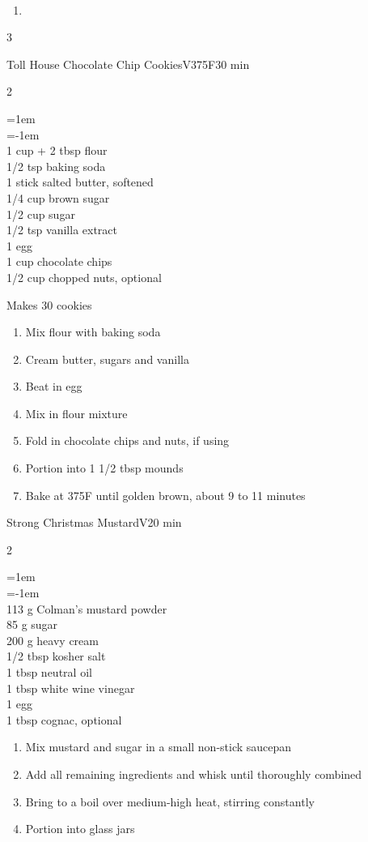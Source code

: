 \documentclass{article}
\makeatletter
\newcommand*{\whiten}[1]{\llap{\textcolor{white}{{\the\SOUL@token}}\hspace{#1pt}}}
\DeclareRobustCommand*\ful{%
    \def\SOUL@everyspace{\underline{\space}\kern\z@}%
    \def\SOUL@everytoken{%
     \setbox0=\hbox{\the\SOUL@token}%
     \ifdim\dp0>\z@
        \raisebox{\dp0}{\underline{\phantom{\the\SOUL@token}}}%
        \whiten{1}\whiten{0}%
        \whiten{-1}\whiten{-2}%
        \llap{\the\SOUL@token}%
     \else
        \underline{\the\SOUL@token}%
     \fi}%
\SOUL@}
\newenvironment{card}[3][]
    {\begin{cardbase}[#1]{#2}{#3}\\}
    {\end{cardbase}}
\newenvironment{densecard}[3][]
    {\small
    \begin{card}[#1]{#2}{#3}}
    {\end{card}}
\newenvironment{recipe}[3][]
    {\begin{cardbase}[#1]{#2}{#3}
    \columnratio{0.333}
    \begin{paracol}{2}}
    {\end{paracol}\end{cardbase}}
\newcommand{\nextcolumn}{\switchcolumn}
\newenvironment{ingredients}
    {
    \begin{obeylines}
    \vspace{\parskip}
    \setlength{\parskip}{0.25em}
    \vspace{-0.25em}
    \leftskip=1em
    \parindent=-1em}
    {\end{obeylines}}
\newenvironment{steps}
    {\begin{enumerate}[leftmargin=*,topsep=0pt]}
    {\end{enumerate}}
\newcommand{\fahrenheit}[1]{#1\textdegree{}F}
\newcommand{\tag}[1]{\hspace{1em}#1}
\newcommand{\symboltag}[2]{\tag{#1\hspace{0.4em}#2}}
\newcommand{\totaltime}[1]{\symboltag{\raisebox{-0.1em}{\small\StopWatchEnd}}{#1}}
\newcommand{\preheat}[1]{\symboltag{\Topbottomheat}{#1}}
\newcommand{\ihead}[1]{\ful{#1}}
\newcommand{\ijoin}{$\cdot{}$}
\makeatother
\begin{document}
\begin{densecard}{}{\tag{}\preheat{}\totaltime{}}
\begin{steps}
    \item
\end{steps}
\begin{paracol}{3}
\end{paracol}
\end{densecard}


\begin{recipe}{Toll House Chocolate Chip Cookies}{\tag{V}\preheat{\fahrenheit{375}}\totaltime{30 min}}
\begin{ingredients}
1 cup + 2 tbsp flour
1/2 tsp baking soda
1 stick salted butter, softened
1/4 cup brown sugar
1/2 cup sugar
1/2 tsp vanilla extract
1 egg
1 cup chocolate chips
1/2 cup chopped nuts, optional
\end{ingredients}
\nextcolumn
Makes 30 cookies
\begin{steps}
    \item Mix flour with baking soda
    \item Cream butter, sugars and vanilla
    \item Beat in egg
    \item Mix in flour mixture
    \item Fold in chocolate chips and nuts, if using
    \item Portion into 1 1/2 tbsp mounds
    \item Bake at \fahrenheit{375} until golden brown, about 9 to 11 minutes
\end{steps}
\end{recipe}

\begin{recipe}{Strong Christmas Mustard}{\tag{V}\totaltime{20 min}}
\begin{ingredients}
113 g Colman's mustard powder
85 g sugar
200 g heavy cream
1/2 tbsp kosher salt
1 tbsp neutral oil
1 tbsp white wine vinegar
1 egg
1 tbsp cognac, \mbox{optional}
\end{ingredients}
\nextcolumn
\begin{steps}
    \item Mix mustard and sugar in a small non-stick saucepan
    \item Add all remaining ingredients and whisk until thoroughly combined
    \item Bring to a boil over medium-high heat, stirring constantly
    \item Portion into glass jars
\end{steps}
\end{recipe}
\end{document}
